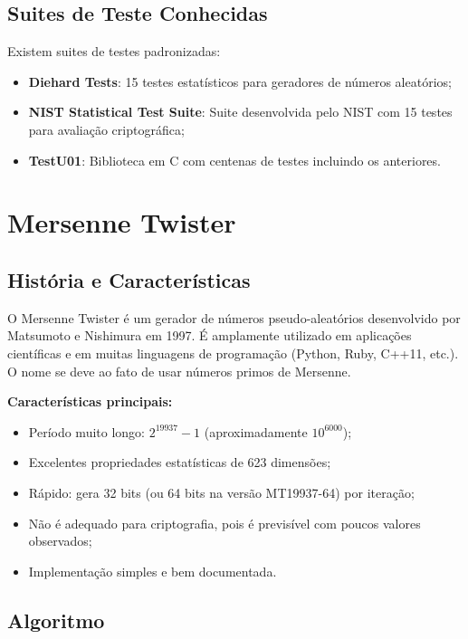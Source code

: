 \documentclass[12pt,a4paper]{article}
\begin{document}
\subsection{Suites de Teste Conhecidas}

Existem suites de testes padronizadas:

\begin{itemize}
    \item \textbf{Diehard Tests}: 15 testes estatísticos para geradores de números aleatórios;
    \item \textbf{NIST Statistical Test Suite}: Suite desenvolvida pelo NIST com 15 testes para avaliação criptográfica;
    \item \textbf{TestU01}: Biblioteca em C com centenas de testes incluindo os anteriores.
\end{itemize}

\newpage

\section{Mersenne Twister}

\subsection{História e Características}

O Mersenne Twister é um gerador de números pseudo-aleatórios desenvolvido por Matsumoto e Nishimura em 1997. É amplamente utilizado em aplicações científicas e em muitas linguagens de programação (Python, Ruby, C++11, etc.). O nome se deve ao fato de usar números primos de Mersenne.

\textbf{Características principais:}
\begin{itemize}
    \item Período muito longo: $2^{19937} - 1$ (aproximadamente $10^{6000}$);
    \item Excelentes propriedades estatísticas de 623 dimensões;
    \item Rápido: gera 32 bits (ou 64 bits na versão MT19937-64) por iteração;
    \item Não é adequado para criptografia, pois é previsível com poucos valores observados;
    \item Implementação simples e bem documentada.
\end{itemize}

\subsection{Algoritmo}
\end{document}
